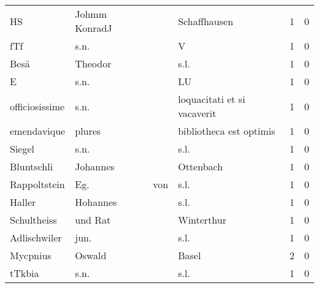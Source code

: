 \begin{center}
\begin{tiny}
\begin{longtabu}{llllrr}
                       HS &                      Johmm KonradJ &             &                                Schaffhausen &          1 &         0 \\
                      fTf &                               s.n. &             &                                           V &          1 &         0 \\
                     Besä &                            Theodor &             &                                        s.l. &          1 &         0 \\
                        E &                               s.n. &             &                                          LU &          1 &         0 \\
           officiosissime &                               s.n. &             &                 loquacitati et si vacaverit &          1 &         0 \\
              emendavique &                             plures &             &                     bibliotheca est optimis &          1 &         0 \\
                   Siegel &                               s.n. &             &                                        s.l. &          1 &         0 \\
               Bluntschli &                           Johannes &             &                                   Ottenbach &          1 &         0 \\
             Rappoltstein &                                Eg. &         von &                                        s.l. &          1 &         0 \\
                   Haller &                           Hohannes &             &                                        s.l. &          1 &         0 \\
              Schultheiss &                            und Rat &             &                                  Winterthur &          1 &         0 \\
             Adlischwiler &                               jun. &             &                                        s.l. &          1 &         0 \\
                 Mycpnius &                             Oswald &             &                                       Basel &          2 &         0 \\
                   tTkbia &                               s.n. &             &                                        s.l. &          1 &         0 \\

\end{longtabu}
\end{tiny}
\end{center}
